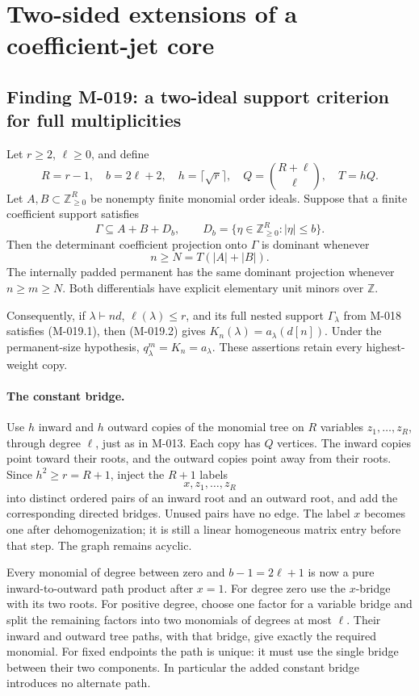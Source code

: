 \section{Two-sided extensions of a coefficient-jet core}

\subsection*{Finding M-019: a two-ideal support criterion for full multiplicities}
Let \(r\geq2\), \(\ell\geq0\), and define
\[
 R=r-1,\quad b=2\ell+2,\quad h=\lceil\sqrt r\rceil,
 \quad Q=\binom{R+\ell}{\ell},\quad T=hQ.
\]
Let \(A,B\subset\mathbb Z_{\geq0}^{R}\) be nonempty
finite monomial order ideals. Suppose that a finite coefficient
support satisfies
\[
                         \Gamma\subseteq A+B+D_b,
      \qquad D_b=\{\eta\in\mathbb Z_{\geq0}^{R}:|\eta|\leq b\}.
                                                               \tag{M-019.1}
\]
Then the determinant coefficient projection onto \(\Gamma\)
is dominant whenever
\[
                            n\geq N=T(|A|+|B|).          \tag{M-019.2}
\]
The internally padded permanent has the same dominant projection
whenever \(n\geq m\geq N\). Both differentials have explicit
elementary unit minors over \(\mathbb Z\).

Consequently, if \(\lambda\vdash nd\), \(\ell(\lambda)\leq r\),
and its full nested support \(\Gamma_\lambda\) from M-018
satisfies (M-019.1), then (M-019.2) gives
\(K_n(\lambda)=a_\lambda(d[n])\). Under the permanent-size
hypothesis, \(q^m_\lambda=K_n=a_\lambda\).
These assertions retain every highest-weight copy.

\paragraph{The constant bridge.}
Use \(h\) inward and \(h\) outward copies of the monomial
tree on \(R\) variables \(z_1,\ldots,z_R\), through degree
\(\ell\), just as in M-013. Each copy has \(Q\) vertices.
The inward copies point toward their roots, and the outward
copies point away from their roots. Since \(h^2\geq r=R+1\),
inject the \(R+1\) labels
\[
                             x,z_1,\ldots,z_R
\]
into distinct ordered pairs of an inward root and an outward
root, and add the corresponding directed bridges. Unused
pairs have no edge. The label \(x\) becomes one after
dehomogenization; it is still a linear homogeneous matrix
entry before that step. The graph remains acyclic.

Every monomial of degree between zero and \(b-1=2\ell+1\)
is now a pure inward-to-outward path product after \(x=1\).
For degree zero use the \(x\)-bridge with its two roots.
For positive degree, choose one factor for a variable bridge
and split the remaining factors into two monomials of degrees
at most \(\ell\). Their inward and outward tree paths,
with that bridge, give exactly the required monomial.
For fixed endpoints the path is unique: it must use the
single bridge between their two components. In particular
the added constant bridge introduces no alternate path.

